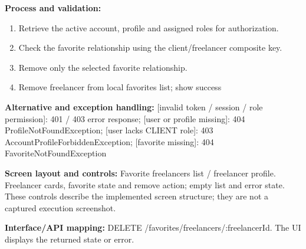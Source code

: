 \textbf{Process and validation:}
\begin{enumerate}
\item Retrieve the active account, profile and assigned roles for authorization.
\item Check the favorite relationship using the client/\allowbreak{}freelancer composite key.
\item Remove only the selected favorite relationship.
\item Remove freelancer from local favorites list; show success
\end{enumerate}
\textbf{Alternative and exception handling:} [invalid token /\allowbreak{} session /\allowbreak{} role permission]: 401 /\allowbreak{} 403 error response; [user or profile missing]: 404 Profile\allowbreak{}Not\allowbreak{}Found\allowbreak{}Exception; [user lacks CLIENT role]: 403 Account\allowbreak{}Profile\allowbreak{}Forbidden\allowbreak{}Exception; [favorite missing]: 404 Favorite\allowbreak{}Not\allowbreak{}Found\allowbreak{}Exception

\textbf{Screen layout and controls:} Favorite freelancers list /\allowbreak{} freelancer profile. Freelancer cards, favorite state and remove action; empty list and error state. These controls describe the implemented screen structure; they are not a captured execution screenshot.

\textbf{Interface/\allowbreak{}API mapping:} DELETE /\allowbreak{}favorites/\allowbreak{}freelancers/\allowbreak{}:freelancer\allowbreak{}Id. The UI displays the returned state or error.

\endgroup
